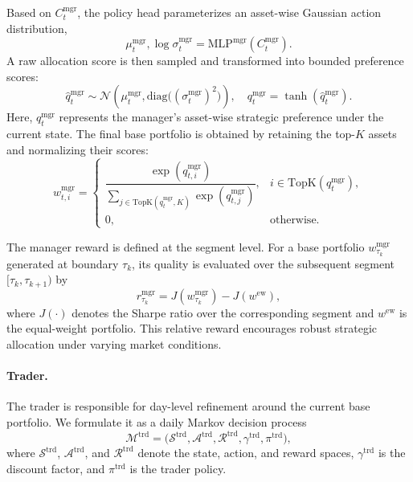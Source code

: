 \documentclass[letterpaper]{article} %
\begin{document}
Based on \(C_t^{\mathrm{mgr}}\), the policy head parameterizes an asset-wise Gaussian action distribution,
\[
\mu_t^{\mathrm{mgr}},\log\sigma_t^{\mathrm{mgr}}
=
\mathrm{MLP}^{\mathrm{mgr}}(C_t^{\mathrm{mgr}}).
\]
A raw allocation score is then sampled and transformed into bounded preference scores:
\[
\hat q_t^{\mathrm{mgr}}
\sim
\mathcal{N}\!\left(
\mu_t^{\mathrm{mgr}},
\mathrm{diag}\bigl((\sigma_t^{\mathrm{mgr}})^2\bigr)
\right),
\quad
q_t^{\mathrm{mgr}}=\tanh(\hat q_t^{\mathrm{mgr}}).
\]
Here, \(q_t^{\mathrm{mgr}}\) represents the manager's asset-wise strategic preference under the current state. The final base portfolio is obtained by retaining the top-\(K\) assets and normalizing their scores:
\[
w_{t,i}^{\mathrm{mgr}}=
\begin{cases}
\dfrac{\exp(q_{t,i}^{\mathrm{mgr}})}
{\sum_{j\in\mathrm{TopK}(q_t^{\mathrm{mgr}},K)}\exp(q_{t,j}^{\mathrm{mgr}})},
& i\in\mathrm{TopK}(q_t^{\mathrm{mgr}}),\\[10pt]
0, & \text{otherwise}.
\end{cases}
\]

The manager reward is defined at the segment level. For a base portfolio \(w_{\tau_k}^{\mathrm{mgr}}\) generated at boundary \(\tau_k\), its quality is evaluated over the subsequent segment \([\tau_k,\tau_{k+1})\) by
\[
r_{\tau_k}^{\mathrm{mgr}}
=
J\!\left(w_{\tau_k}^{\mathrm{mgr}}\right)
-
J\!\left(w^{\mathrm{ew}}\right),
\]
where \(J(\cdot)\) denotes the Sharpe ratio over the corresponding segment and \(w^{\mathrm{ew}}\) is the equal-weight portfolio. This relative reward encourages robust strategic allocation under varying market conditions.

\paragraph{Trader.}
The trader is responsible for day-level refinement around the current base portfolio. We formulate it as a daily Markov decision process
\[
\mathcal{M}^{\mathrm{trd}}
=
\bigl(
\mathcal{S}^{\mathrm{trd}},
\mathcal{A}^{\mathrm{trd}},
\mathcal{R}^{\mathrm{trd}},
\gamma^{\mathrm{trd}},
\pi^{\mathrm{trd}}
\bigr),
\]
where \(\mathcal{S}^{\mathrm{trd}}\), \(\mathcal{A}^{\mathrm{trd}}\), and \(\mathcal{R}^{\mathrm{trd}}\) denote the state, action, and reward spaces, \(\gamma^{\mathrm{trd}}\) is the discount factor, and \(\pi^{\mathrm{trd}}\) is the trader policy.
\end{document}
